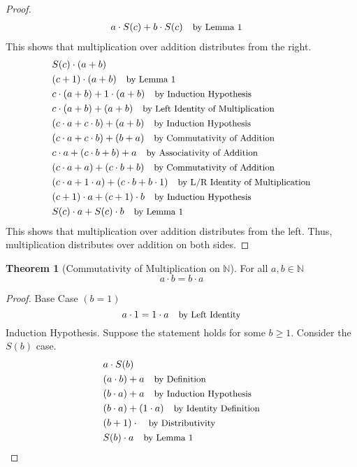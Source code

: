 \documentclass[12pt]{article}
\newcommand{\stext}[1]{\quad\text{\small #1}}
\theoremstyle{definition}
\newtheorem{theorem}{Theorem}
\begin{document}
\begin{proof}
\begin{align*}
        & a \cdot S(c) + b \cdot S(c) \stext{by Lemma 1}
    \end{align*}
    This shows that multiplication over addition distributes from the right.
    \begin{align*}
        & S(c) \cdot (a + b) \\ 
        & (c + 1) \cdot (a + b) \stext{by Lemma 1} \\ 
        & c \cdot (a + b) + 1 \cdot (a + b) \stext{by Induction Hypothesis} \\ 
        & c \cdot (a + b) + (a + b) \stext{by Left Identity of Multiplication} \\
        & (c \cdot a + c \cdot b) + (a + b) \stext{by Induction Hypothesis} \\ 
        & (c \cdot a + c \cdot b) + (b + a) \stext{by Commutativity of Addition} \\ 
        & c \cdot a + (c \cdot b + b) + a \stext{by Associativity of Addition} \\ 
        & (c \cdot a + a) + (c \cdot b + b) \stext{by Commutativity of Addition} \\ 
        & (c \cdot a + 1 \cdot a) + (c \cdot b + b \cdot 1) \stext{by L/R Identity of Multiplication}\\ 
        & (c + 1) \cdot a + (c + 1) \cdot b \stext{by Induction Hypothesis} \\
        & S(c) \cdot a + S(c) \cdot b \stext{by Lemma 1}
    \end{align*}
    This shows that multiplication over addition distributes from the left.
    Thus, multiplication distributes over addition on both sides.
\end{proof}

\begin{theorem}[Commutativity of Multiplication on $\mathbb{N}$] For all $a, b \in \mathbb{N}$
    \begin{equation*}
        a \cdot b = b \cdot a
    \end{equation*}
\end{theorem}
\begin{proof} Base Case $(b = 1)$
    \begin{equation*}
        a \cdot 1 = 1 \cdot a \stext{by Left Identity}
    \end{equation*}
    Induction Hypothesis. Suppose the statement holds for some $b \geq 1$. Consider the $S(b)$ case.
    \begin{align*}
        & a \cdot S(b) \\
        & (a \cdot b) + a \stext{by Definition} \\
        & (b \cdot a) + a \stext{by Induction Hypothesis} \\
        & (b \cdot a) + (1 \cdot a) \stext{by Identity Definition}\\
        & (b + 1) \cdot \stext{by Distributivity} \\
        & S(b) \cdot a \stext{by Lemma 1}
    \end{align*}
\end{proof}
\end{document}
